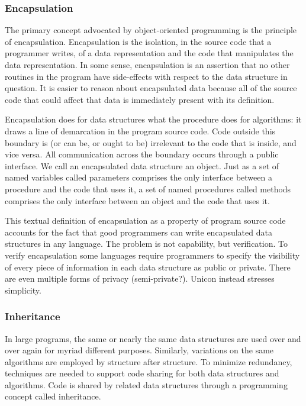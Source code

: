 \subsubsection{Encapsulation}
The primary concept advocated by object-oriented programming is the
principle of encapsulation. Encapsulation is the
isolation, in the source code that a programmer writes, of a data
representation and the code that manipulates the data representation.
In some sense, encapsulation is an assertion that no other routines in
the program have {\textquotedbl}side-effects{\textquotedbl} with
respect to the data structure in question. It is easier to reason about
encapsulated data because all of the source code that could affect that
data is immediately present with its definition. 

Encapsulation does for data structures what the procedure does for
algorithms: it draws a line of demarcation in the program source code.
Code outside this boundary is (or can be, or ought to be) irrelevant to
the code that is inside, and vice versa. All communication across the
boundary occurs through a public interface. We call an encapsulated
data structure an object. Just as a set of named variables called
parameters comprises the only interface between a procedure and the
code that uses it, a set of named procedures called methods comprises
the only interface between an object and the code that uses it. 

This textual definition of encapsulation as a property of program source
code accounts for the fact that good programmers can write encapsulated
data structures in any language. The problem is not capability, but
verification. To verify encapsulation some languages require
programmers to specify the visibility of every piece of information in
each data structure as {\textquotedbl}public{\textquotedbl} or
{\textquotedbl}private.{\textquotedbl} There are even multiple forms of
privacy (semi-private?). Unicon instead stresses simplicity. 

\subsubsection{Inheritance}
In large programs, the same or nearly the same data structures are used
over and over again for myriad different purposes. Similarly,
variations on the same algorithms are employed by structure after
structure. To minimize redundancy, techniques are needed to support
code sharing for both data structures and algorithms. Code is shared by
related data structures through a programming concept called
inheritance. 

